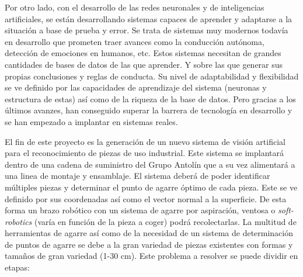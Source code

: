 Por otro lado, con el desarrollo de las redes neuronales y de inteligencias artificiales, se están desarrollando sistemas capaces de aprender y adaptarse a la situación a base de prueba y error. Se trata de sistemas muy modernos todavía en desarrollo que prometen traer avances como la conducción autónoma, detección de emociones en humanos, etc. Estos sistemas necesitan de grandes cantidades de bases de datos de las que aprender. Y sobre las que generar sus propias conclusiones y reglas de conducta. Su nivel de adaptabilidad y flexibilidad se ve definido por las capacidades de aprendizaje del sistema (neuronas y estructura de estas) así como de la riqueza de la base de datos. Pero gracias a los últimos avanzes, han conseguido superar la barrera de tecnología en desarrollo y se han empezado a implantar en sistemas reales.

El fin de este proyecto es la generación de un nuevo sistema de visión artificial para el reconocimiento de piezas de uso industrial. Este sistema se implantará dentro de una cadena de suministro del Grupo Antolín\textsuperscript{\textregistered} que a su vez alimentará a una linea de montaje y ensamblaje. El sistema deberá de poder identificar múltiples piezas y determinar el punto de agarre óptimo de cada pieza. Este se ve definido por sus coordenadas así como el vector normal a la superficie. De esta forma un brazo robótico con un sistema de agarre por aspiración, ventosa o \textit{soft-robotics} (varía en función de la pieza a coger) podrá recolectarlas. La multitud de herramientas de agarre así como de la necesidad de un sistema de determinación de puntos de agarre se debe a la gran variedad de piezas existentes con formas y tamaños de gran variedad (1-30 cm). Este problema a resolver se puede dividir en etapas:

